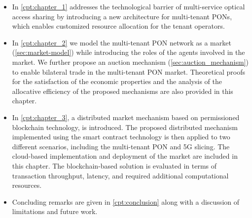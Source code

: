 \begin{itemize}
    \item In \autoref{cpt:chapter_1} addresses the technological barrier of multi-service optical access sharing by introducing a new architecture for multi-tenant \acp{PON}, which enables customized resource allocation for the tenant operators.
    \item In \autoref{cpt:chapter_2} we model the multi-tenant \ac{PON} network as a market (\autoref{sec:market-model}) while introducing the roles of the agents involved in the market. We further propose an auction mechanism (\autoref{sec:auction_mechanism}) to enable bilateral trade in the multi-tenant \ac{PON} market. Theoretical proofs for the satisfaction of the economic properties and the analysis of the allocative efficiency of the proposed mechanisms are also provided in this chapter.
    \item In \autoref{cpt:chapter_3}, a distributed market mechanism based on permissioned blockchain technology, is introduced. The proposed distributed mechanism implemented using the smart contract technology is then applied to two different scenarios, including the multi-tenant \ac{PON} and \ac{5G} slicing. The cloud-based implementation and deployment of the market are included in this chapter. The blockchain-based solution is evaluated in terms of transaction throughput, latency, and required additional computational resources.
    
    
    
    \item Concluding remarks are given in \autoref{cpt:conclusion} along with a discussion of limitations and future work.
    
    \end{itemize}



